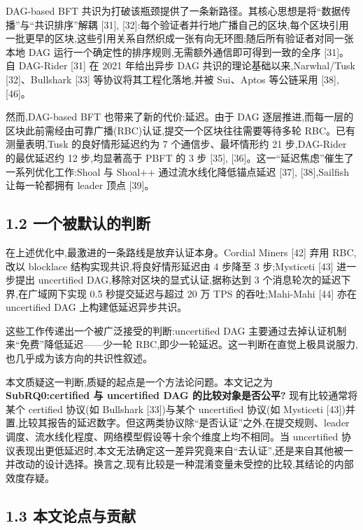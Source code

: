 \documentclass[UTF8,fontset=windows,a4paper,11pt]{ctexart}
\begin{document}
DAG-based BFT
共识为打破该瓶颈提供了一条新路径。其核心思想是将``数据传播''与``共识排序''解耦
{[}31{]},
{[}32{]}:每个验证者并行地广播自己的区块,每个区块引用一批更早的区块,这些引用关系自然织成一张有向无环图;随后所有验证者对同一张本地
DAG 运行一个确定性的排序规则,无需额外通信即可得到一致的全序 {[}31{]}。自
DAG-Rider {[}31{]} 在 2021 年给出异步 DAG
共识的理论基础以来,Narwhal/Tusk {[}32{]}、Bullshark {[}33{]}
等协议将其工程化落地,并被 Sui、Aptos 等公链采用 {[}38{]}, {[}46{]}。

然而,DAG-based BFT 也带来了新的代价:延迟。由于 DAG
逐层推进,而每一层的区块此前需经由可靠广播(RBC)认证,提交一个区块往往需要等待多轮
RBC。已有测量表明,Tusk 的良好情形延迟约为 7 个通信步、最坏情形约 21
步,DAG-Rider 的最优延迟约 12 步,均显著高于 PBFT 的 3 步 {[}35{]},
{[}36{]}。这一``延迟焦虑''催生了一系列优化工作:Shoal 与 Shoal++
通过流水线化降低锚点延迟 {[}37{]}, {[}38{]},Sailfish 让每一轮都拥有
leader 顶点 {[}39{]}。

\subsection{1.2
一个被默认的判断}\label{ux4e00ux4e2aux88abux9ed8ux8ba4ux7684ux5224ux65ad}

在上述优化中,最激进的一条路线是放弃认证本身。Cordial Miners {[}42{]}
弃用 RBC,改以 blocklace 结构实现共识,将良好情形延迟由 4 步降至 3
步;Mysticeti {[}43{]} 进一步提出 uncertified
DAG,移除对区块的显式认证,据称达到 3 个消息轮次的延迟下界,在广域网下实现
0.5 秒提交延迟与超过 20 万 TPS 的吞吐;Mahi-Mahi {[}44{]} 亦在
uncertified DAG 上构建低延迟异步共识。

这些工作传递出一个被广泛接受的判断:uncertified DAG
主要通过去掉认证机制来``免费''降低延迟------少一轮
RBC,即少一轮延迟。这一判断在直觉上极具说服力,也几乎成为该方向的共识性叙述。

本文质疑这一判断,质疑的起点是一个方法论问题。本文记之为
\textbf{SubRQ0:certified 与 uncertified DAG 的比较对象是否公平?}
现有比较通常将某个 certified 协议(如 Bullshark {[}33{]})与某个
uncertified 协议(如 Mysticeti
{[}43{]})并置,比较其报告的延迟数字。但这两类协议除``是否认证''之外,在提交规则、leader
调度、流水线化程度、网络模型假设等十余个维度上均不相同。当 uncertified
协议表现出更低延迟时,本文无法确定这一差异究竟来自``去认证'',还是来自其他被一并改动的设计选择。换言之,现有比较是一种混淆变量未受控的比较,其结论的内部效度存疑。

\subsection{1.3
本文论点与贡献}\label{ux672cux6587ux8bbaux70b9ux4e0eux8d21ux732e}
\end{document}
